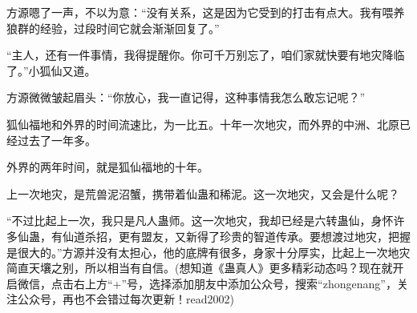 \begin{this_body}
方源嗯了一声，不以为意：“没有关系，这是因为它受到的打击有点大。我有喂养狼群的经验，过段时间它就会渐渐回复了。”

“主人，还有一件事情，我得提醒你。你可千万别忘了，咱们家就快要有地灾降临了。”小狐仙又道。

方源微微皱起眉头：“你放心，我一直记得，这种事情我怎么敢忘记呢？”

狐仙福地和外界的时间流速比，为一比五。十年一次地灾，而外界的中洲、北原已经过去了一年多。

外界的两年时间，就是狐仙福地的十年。

上一次地灾，是荒兽泥沼蟹，携带着仙蛊和稀泥。这一次地灾，又会是什么呢？

“不过比起上一次，我只是凡人蛊师。这一次地灾，我却已经是六转蛊仙，身怀许多仙蛊，有仙道杀招，更有盟友，又新得了珍贵的智道传承。要想渡过地灾，把握是很大的。”方源并没有太担心，他的底牌有很多，身家十分厚实，比起上一次地灾简直天壤之别，所以相当有自信。(想知道《蛊真人》更多精彩动态吗？现在就开启微信，点击右上方“+”号，选择添加朋友中添加公众号，搜索“zhongenang”，关注公众号，再也不会错过每次更新！read2002)

\end{this_body}

